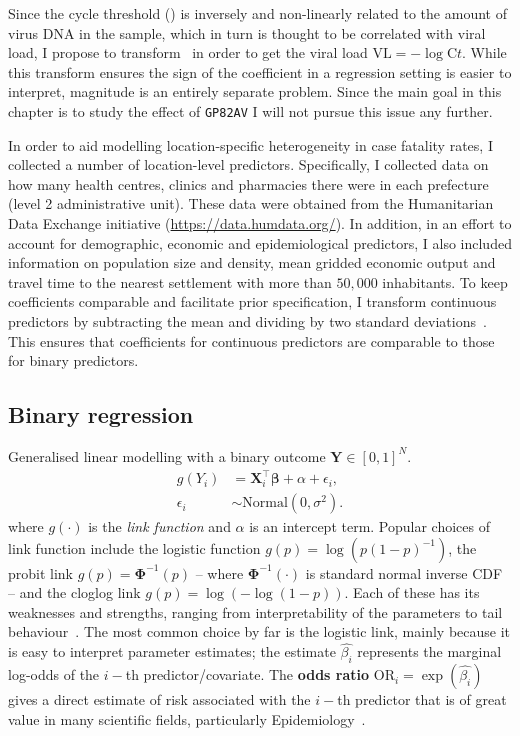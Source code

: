 Since the cycle threshold (\ct) is inversely and non-linearly related to the amount of virus DNA in the sample, which in turn is thought to be correlated with viral load, I propose to transform \ct~in order to get the viral load $\text{VL} = -\log \text{C}t$.
While this transform ensures the sign of the coefficient in a regression setting is easier to interpret, magnitude is an entirely separate problem.
Since the main goal in this chapter is to study the effect of \verb|GP82AV| I will not pursue this issue any further.

In order to aid modelling location-specific heterogeneity in case fatality rates, I collected a number of location-level predictors.
Specifically, I collected data on how many health centres, clinics and pharmacies there were in each prefecture (level 2 administrative unit).
These data were obtained from the Humanitarian Data Exchange initiative (\url{https://data.humdata.org/}).
In addition, in an effort to account for demographic, economic and epidemiological predictors, I also included information on population size and density, mean gridded economic output and travel time to the nearest settlement with more than $50,000$ inhabitants.
To keep coefficients comparable and facilitate prior specification, I transform continuous predictors by subtracting the mean and dividing by two standard deviations~\citep{Gelman2008}.
This ensures that coefficients for continuous predictors are comparable to those for binary predictors.

\subsection{Binary regression}
\label{sec:binreg}

Generalised linear modelling  with a binary outcome $\boldsymbol Y \in [0, 1]^N$.
\begin{align}
 \label{eq:binglm}
 g(Y_i) &= \boldsymbol X_i^\intercal \boldsymbol\beta + \alpha  + \epsilon_i,\\
 \epsilon_i &\sim \text{Normal}(0, \sigma^2).
\end{align} 
where $g(\cdot)$ is the \textit{link function} and $\alpha$ is an intercept term.
Popular choices of link function include the logistic function $g(p) = \log\left(p(1-p)^{-1} \right)$, the probit link $g(p) = \boldsymbol\Phi^{-1}(p)$ -- where  $\boldsymbol\Phi^{-1}(\cdot)$ is standard normal inverse CDF -- and the cloglog link $g(p) = \log(-\log(1-p))$.
Each of these has its weaknesses and strengths, ranging from interpretability of the parameters to tail behaviour~\citep{Czado2006}.
The most common choice by far is the logistic link, mainly because it is easy to interpret parameter estimates; the estimate $\hat{\beta_i}$ represents the marginal log-odds of the $i-$th predictor/covariate.
The \textbf{odds ratio} $\text{OR}_i = \exp(\hat{\beta_i})$ gives a direct estimate of risk associated with the $i-$th predictor that is of great value in many scientific fields, particularly Epidemiology~\citep{Schmidt2008}.

